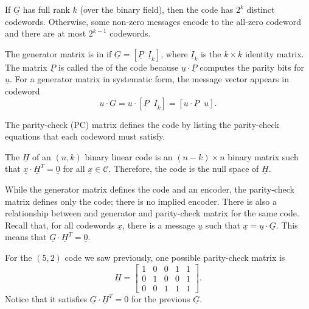 If $\underline{G}$ has full rank $k$ (over the binary field), then the code has $2^{k}$ distinct codewords.
Otherwise, some non-zero messages encode to the all-zero codeword and there are at most $2^{k-1}$ codewords.

\begin{definition}
The generator matrix is in  if $\underline{G}=\left[\underline{P}\,\,\,\underline{I}_{k}\right]$, where $\underline{I}_{k}$ is the $k\times k$ identity matrix.
The matrix $\underline{P}$ is called the  of the code because $\underline{u}\cdot\underline{P}$ computes the parity bits for $\underline{u}$.
For a generator matrix in systematic form, the message vector appears in codeword
\[\underline{u}\cdot\underline{G}=\underline{u}\cdot\left[\underline{P}\;\;\underline{I}_{k}\right]=\left[\underline{u}\!\cdot\!\underline{P}\;\;\underline{u}\right]. \]
\end{definition}

The parity-check (PC) matrix defines the code by listing the parity-check equations that each codeword must satisfy.

\begin{definition}
The  $\underline{H}$ of an $(n,k)$ binary linear code is an $(n-k)\times n$ binary matrix such that $\underline{x}\cdot\underline{H}^{T}=\underline{0}$ for all $\underline{x}\in\mathcal{C}$.
Therefore, the code is the null space of $\underline{H}$.
\end{definition}

While the generator matrix defines the code and an encoder, the parity-check matrix defines only the code; there is no implied encoder.
There is also a relationship between and generator and parity-check matrix for the same code.
Recall that, for all codewords $\underline{x}$,  there is a message $\underline{u}$ such that $\underline{x}=\underline{u}\cdot\underline{G}$.
This means that $\underline{G}\cdot\underline{H}^{T}=\underline{0}$.

\begin{example}
For the $(5,2)$ code we saw previously, one possible parity-check matrix is
\[ \underline{H}=\left[\begin{array}{ccccc}
1 & 0 & 0 & 1 & 1\\
0 & 1 & 0 & 0 & 1\\
0 & 0 & 1 & 1 & 1\end{array}\right]. \]
Notice that it satisfies $\underline{G}\cdot\underline{H}^{T}=0$ for the previous $\underline{G}$.
\end{example}

